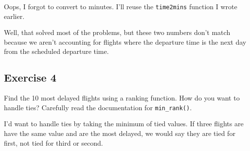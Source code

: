 \documentclass[]{book}
\newenvironment{Shaded}{\begin{snugshade}}{\end{snugshade}}
\newcommand{\CommentTok}[1]{\textcolor[rgb]{0.56,0.35,0.01}{\textit{#1}}}
\newcommand{\DataTypeTok}[1]{\textcolor[rgb]{0.13,0.29,0.53}{#1}}
\newcommand{\KeywordTok}[1]{\textcolor[rgb]{0.13,0.29,0.53}{\textbf{#1}}}
\newcommand{\NormalTok}[1]{#1}
\newcommand{\OperatorTok}[1]{\textcolor[rgb]{0.81,0.36,0.00}{\textbf{#1}}}
\newcommand{\StringTok}[1]{\textcolor[rgb]{0.31,0.60,0.02}{#1}}
\theoremstyle{plain}
\theoremstyle{remark}
\theoremstyle{definition}
\theoremstyle{definition}
\theoremstyle{definition}
\theoremstyle{remark}
\begin{document}
Oops, I forgot to convert to minutes. I'll reuse the \texttt{time2mins}
function I wrote earlier.

\begin{Shaded}
\end{Shaded}

Well, that solved most of the problems, but these two numbers don't
match because we aren't accounting for flights where the departure time
is the next day from the scheduled departure time.

\hypertarget{exercise-4-6}{%
\subsection{Exercise 4}\label{exercise-4-6}}

Find the 10 most delayed flights using a ranking function. How do you
want to handle ties? Carefully read the documentation for
\texttt{min\_rank()}.

I'd want to handle ties by taking the minimum of tied values. If three
flights are have the same value and are the most delayed, we would say
they are tied for first, not tied for third or second.
\end{document}

